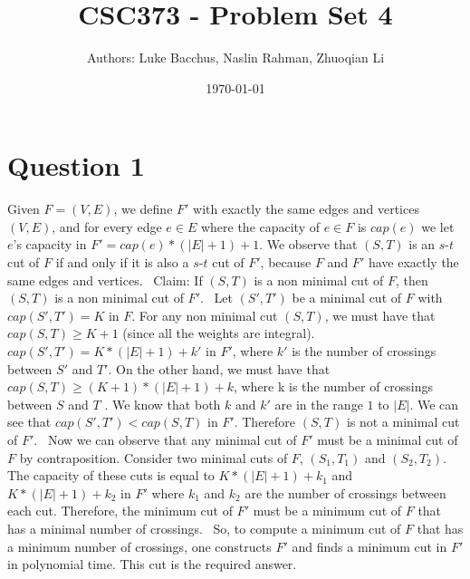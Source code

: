\documentclass[12pt]{article}
\title{\textbf{CSC373 - Problem Set 4}}
\author{Authors: Luke Bacchus, Naslin Rahman, Zhuoqian Li}
\date{\today}
\begin{document}
\maketitle
\section*{Question 1}
Given $F = (V, E)$, we define $F'$ with exactly the same edges and vertices $(V, E)$, and for every edge $e \in E$ where the capacity of $e \in F$ is $cap(e)$ we let $e$'s capacity in $F' = cap(e) * (|E| + 1) + 1$.  We observe that $(S, T)$ is an $s$-$t$ cut of $F$ if and only if it is also a $s$-$t$ cut of $F'$, because $F$ and $F'$ have exactly the same edges and vertices. 
\newline \,
\newline Claim: If $(S, T)$ is a non minimal cut of $F$, then $(S, T)$ is a non minimal cut of $F'$. \newline \,
\newline Let $(S', T')$ be a minimal cut of $F$ with $cap(S', T') = K$ in $F$. For any non minimal cut $(S, T)$, we must have that $cap(S, T) \geq K + 1$ (since all the weights are integral). $cap(S', T') = K * (|E| + 1) + k'$ in $F'$, where $k'$ is the number of crossings between $S'$ and $T'$. On the other hand, we must have that $cap(S, T) \geq (K + 1) * (|E| + 1) + k$, where k is the number of crossings between $S$ and $T$ . We know that both $k$ and $k'$ are in the range $1$ to $|E|$. We can see that $cap(S', T') < cap(S, T)$ in $F'$. Therefore $(S, T)$ is not a minimal cut of $F'$.
\newline \, 
\newline
Now we can observe that any minimal cut of $F'$ must be a minimal cut of $F$ by contraposition. Consider two minimal cuts of $F$, $(S_1, T_1)$ and $(S_2, T_2)$. The capacity of these cuts is equal to $K * (|E| + 1) + k_1$ and $K * (|E| + 1) + k_2$ in $F'$ where $k_1$ and $k_2$ are the number of crossings between each cut. Therefore, the minimum cut of $F'$ must be a minimum cut of $F$ that has a minimal number of crossings.
\newline \, \newline
So, to compute a minimum cut of $F$ that has a minimum number of crossings, one constructs $F'$ and finds a minimum cut in $F'$ in polynomial time. This cut is the required answer.


\newpage
\end{document}
